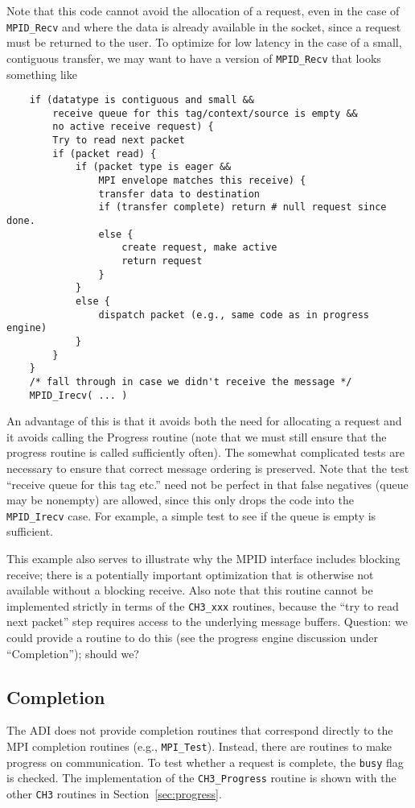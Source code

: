 \documentclass{article}
\def\mpids#1#2{\code{#2}\index{#1!#2}}
\def\code{\begingroup\makeustext\eatcode}
\def\eatcode#1{\texttt{#1}\endgroup}
\begin{document}
Note that this code cannot avoid the allocation of a request, even in
the case of \code{MPID_Recv} and where the data is already available in the
socket, since a request must be returned to the user.  To
optimize for low latency in the case of a small, contiguous transfer,
we may want to have a version of \code{MPID_Recv} that looks something
like
\begin{verbatim}
    if (datatype is contiguous and small &&
        receive queue for this tag/context/source is empty &&
        no active receive request) {
        Try to read next packet
        if (packet read) {
            if (packet type is eager &&
                MPI envelope matches this receive) {
                transfer data to destination
                if (transfer complete) return # null request since done.
                else {
                    create request, make active
                    return request
                }
            }
            else {
                dispatch packet (e.g., same code as in progress engine)
            }
        } 
    }
    /* fall through in case we didn't receive the message */
    MPID_Irecv( ... )
\end{verbatim}
An advantage of this is that it avoids both the need for allocating a
request and it avoids calling the Progress routine (note that we must
still ensure that the progress routine is called sufficiently often).
The somewhat complicated tests are necessary to ensure that correct message
ordering is preserved. Note that the test ``receive queue for this tag
etc.'' need not be perfect in that false negatives (queue may be
nonempty) are allowed, since this only drops the code into the
\code{MPID_Irecv} case.  For example, a simple test to see if the
queue is empty is sufficient.

This example also serves to illustrate why the MPID interface includes
blocking receive; there is a potentially important optimization that
is otherwise not available without a blocking receive.  Also note that
this routine cannot be implemented strictly 
in terms of the \code{CH3_xxx} routines, because the ``try to read next
packet'' step requires access to the underlying message buffers.  
Question: we could provide a routine to do this (see the progress engine
discussion under ``Completion''); should we?

\subsection{Completion}
The ADI does not provide completion routines that correspond directly
to the MPI completion routines (e.g., \code{MPI_Test}).  Instead,
there are routines to make progress on communication.  To test whether
a request is complete, the \mpids{MPID_Request}{busy} flag is checked.
The implementation of the \code{CH3_Progress} routine is shown with the other
\code{CH3} routines in Section~\ref{sec:progress}.
\end{document}
